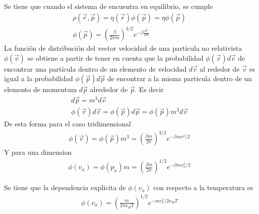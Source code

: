 \documentclass{article}
\begin{document}
Se tiene que cuando el sistema de encuentra en equilibrio, se cumple 
\begin{gather*}
  \rho(\vec r, \vec p) = \eta(\vec r) \phi (\vec p ) = \eta \phi(\vec p) \\
  \phi(\vec p) = \left(\frac{\beta}{2\pi m }\right)^ {3/2 } e ^ {- \beta \frac{p^2 }{2m }}
\end{gather*}
La función de distribución del vector velocidad de una partícula no relativista $ \phi(\vec v )  $ se obtiene a partir de tener en cuenta que la probabilidad $ \phi(\vec v )d\vec v $ de encontrar una partícula dentro de un elemento de velocidad $ d\vec v  $ al rededor de $ \vec v  $ es igual a la probabilidad $ \phi(\vec p) d\vec p  $ de encontrar a la misma particula dentro de un elemento de momentum $ d\vec p  $ alrededor de $ \vec p  $. Es decir 
\begin{gather*}
  d\vec p = m^3 d\vec v \\
  \phi(\vec v ) d\vec v = \phi(\vec p ) d\vec p = \phi(\vec p) m ^3 d\vec v 
\end{gather*}
De esta forma para el caso tridimensional 
\begin{gather*}
  \phi(\vec v ) = \phi(\vec p ) m^3 = \left(\frac{\beta m }{2\pi }\right)^ {3/2 } e ^ {- \beta m v^2 /2 } 
\end{gather*}
Y para una dimension 
\begin{gather*}
  \phi( v_x ) = \phi( p_x ) m = \left(\frac{\beta m }{2\pi }\right)^ {1/2 } e ^ {- \beta m v_x^2 /2 } 
\end{gather*}

Se tiene que la dependencia explicita de $ \phi(v_x)  $ con respecto a la temperatura es 
\begin{gather*}
  \phi(v_x ) = \left(\frac{m }{2\pi \kappa_B T }\right)^ {1/2 } e ^ {-m v_x^2/2\kappa_B T } 
\end{gather*}

\hfill 

\hfill 
\end{document}
